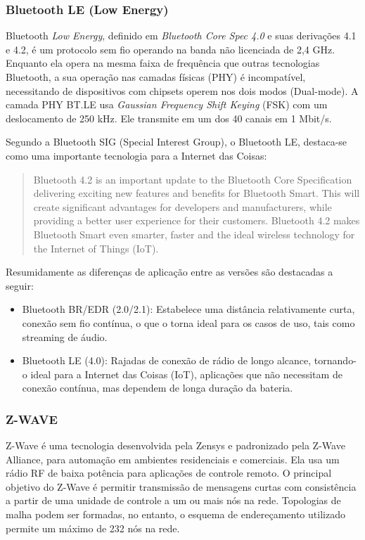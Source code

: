 \subsubsection{Bluetooth LE (Low Energy)}

Bluetooth \emph{Low Energy}, definido em \emph{Bluetooth Core Spec
4.0}\cite{bluetooth2010} e suas derivações 4.1 e 4.2, é um protocolo
sem fio operando na banda não licenciada de 2,4 GHz. Enquanto ela
opera na mesma faixa de frequência que outras tecnologias Bluetooth,
a sua operação nas camadas físicas (PHY) é incompatível, necessitando
de dispositivos com chipsets operem nos dois modos (Dual-mode)\cite{bluetooth2010}.
A camada PHY BT.LE usa \emph{Gaussian Frequency Shift Keying} (FSK)
com um deslocamento de 250 kHz. Ele transmite em um dos 40 canais
em 1 Mbit/s.

Segundo a Bluetooth SIG (Special Interest Group), o Bluetooth LE,
destaca-se como uma importante tecnologia para a Internet das Coisas:
\begin{quote}
Bluetooth 4.2 is an important update to the Bluetooth Core Specification
delivering exciting new features and benefits for Bluetooth Smart.
This will create significant advantages for developers and manufacturers,
while providing a better user experience for their customers. Bluetooth
4.2 makes Bluetooth Smart even smarter, faster and the ideal wireless
technology for the Internet of Things (IoT).\cite{bluetooth2010:site}
\end{quote}
Resumidamente as diferenças de aplicação entre as versões são destacadas
a seguir:
\begin{itemize}
\item Bluetooth BR/EDR (2.0/2.1): Estabelece uma distância relativamente
curta, conexão sem fio contínua, o que o torna ideal para os casos
de uso, tais como streaming de áudio. 
\item Bluetooth LE (4.0): Rajadas de conexão de rádio de longo alcance,
tornando-o ideal para a Internet das Coisas (IoT), aplicações que
não necessitam de conexão contínua, mas dependem de longa duração
da bateria.
\end{itemize}

\subsubsection{Z-WAVE }

Z-Wave é uma tecnologia desenvolvida pela Zensys e padronizado pela
Z-Wave Alliance, para automação em ambientes residenciais e comerciais.
Ela usa um rádio RF de baixa potência para aplicações de controle
remoto. O principal objetivo do Z-Wave é permitir transmissão de mensagens
curtas com consistência a partir de uma unidade de controle a um ou
mais nós na rede\cite{zwave:protocol2006}. Topologias de malha podem
ser formadas, no entanto, o esquema de endereçamento utilizado permite
um máximo de 232 nós na rede.

